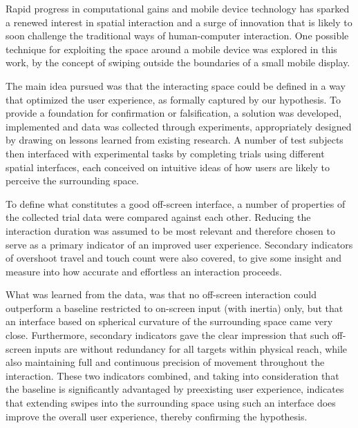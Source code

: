 
\noi	
Rapid progress in computational gains and mobile device technology has sparked a renewed interest in spatial interaction and a surge of innovation that is likely to soon challenge the traditional  ways of human-computer interaction. One possible technique for exploiting the space around a mobile device was explored in this work, by the concept of swiping outside the boundaries of a small mobile display. 

The main idea pursued was that the interacting space could be defined in a way that optimized the user experience, as formally captured by our hypothesis. To provide a foundation for confirmation or falsification, a solution was developed, implemented and data was collected through experiments, appropriately designed by drawing on lessons learned from existing research. A number of test subjects then interfaced with experimental tasks by completing trials using different  spatial interfaces, each  conceived on intuitive ideas of how users are likely to perceive the surrounding space. 

To define what constitutes a good off-screen interface, a number of  properties of the collected trial data were compared against each other. Reducing the interaction duration was assumed to be most relevant  and therefore chosen to serve as a primary indicator of an improved user experience. Secondary indicators of overshoot travel and touch count were also covered, to give some insight and measure into how accurate and effortless an interaction proceeds. 

What was learned from the  data, was that no off-screen interaction could outperform a   baseline restricted to on-screen input (with inertia) only, but that an interface based on spherical curvature of the surrounding space came very close. Furthermore, secondary indicators gave the clear impression that such off-screen inputs are without redundancy for all targets within physical reach, while also maintaining  full and continuous precision of movement throughout the interaction. These two indicators combined, and taking into consideration that the baseline is significantly advantaged by preexisting user experience, indicates that extending swipes into the surrounding space using such an interface does improve the overall user experience, thereby confirming the hypothesis.


